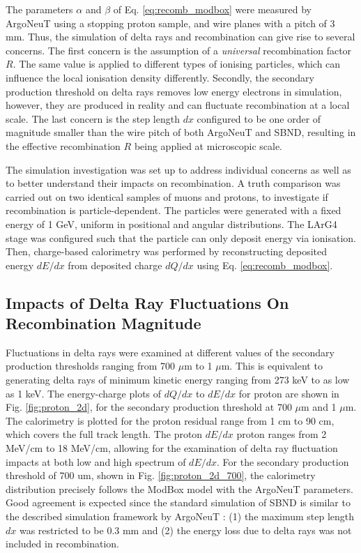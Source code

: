 The parameters $\alpha$ and $\beta$ of Eq. \ref{eq:recomb_modbox} were measured by ArgoNeuT using a stopping proton sample, and wire planes with a pitch of 3 mm.
Thus, the simulation of delta rays and recombination can give rise to several concerns.                                                                                                       
The first concern is the assumption of a \textit{universal} recombination factor $R$.
The same value is applied to different types of ionising particles, which can influence the local ionisation density differently. 
Secondly, the secondary production threshold on delta rays removes low energy electrons in simulation, however, they are produced in reality and can fluctuate recombination at a local scale. 
The last concern is the step length $dx$ configured to be one order of magnitude smaller than the wire pitch of both ArgoNeuT and SBND, resulting in the effective recombination $R$ being applied at microscopic scale.                                                                                                                     

The simulation investigation was set up to address individual concerns as well as to better understand their impacts on recombination.    
A truth comparison was carried out on two identical samples of muons and protons, to investigate if recombination is particle-dependent.
The particles were generated with a fixed energy of 1 GeV, uniform in positional and angular distributions.
The LArG4 stage was configured such that the particle can only deposit energy via ionisation.
Then, charge-based calorimetry was performed by reconstructing deposited energy $dE/dx$ from deposited charge $dQ/dx$ using Eq. \ref{eq:recomb_modbox}.

\subsection{Impacts of Delta Ray Fluctuations On Recombination Magnitude}
\label{sec:impactDeltaRayMag}

Fluctuations in delta rays were examined at different values of the secondary production thresholds ranging from 700 $\mu$m to 1 $\mu$m.
This is equivalent to generating delta rays of minimum kinetic energy ranging from 273 keV to as low as 1 keV.
The energy-charge plots of $dQ/dx$ to $dE/dx$ for proton are shown in Fig. \ref{fig:proton_2d}, for the secondary production threshold at 700 $\mu$m and 1 $\mu$m.
The calorimetry is plotted for the proton residual range from 1 cm to 90 cm, which covers the full track length. 
The proton $dE/dx$ proton ranges from 2 MeV/cm to 18 MeV/cm, allowing for the examination of delta ray fluctuation impacts at both low and high spectrum of $dE/dx$. 
For the secondary production threshold of 700 um, shown in Fig. \ref{fig:proton_2d_700}, the calorimetry distribution precisely follows the ModBox model with the ArgoNeuT parameters.
Good agreement is expected since the standard simulation of SBND is similar to the described simulation framework by ArgoNeuT \cite{argoneut_recomb}: (1) the maximum step length $dx$ was restricted to be 0.3 mm and (2) the energy loss due to delta rays was not included in recombination.
  
